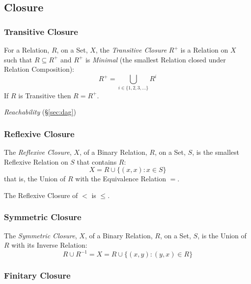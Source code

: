 \subsection{Closure}\label{sec:set_closure}

\subsubsection{Transitive Closure}\label{sec:transitive_closure}

For a Relation, $R$, on a Set, $X$, the \emph{Transitive Closure}
$R^+$ is a Relation on $X$ such that $R \subseteq R^+$ and $R^+$ is
\emph{Minimal} (the smallest Relation closed under Relation
Composition):
\[
    R^+ = \bigcup_{i \in \{1,2,3,...\}} R^i
\]
If $R$ is Transitive then $R = R^+$.

\emph{Reachability} (\S\ref{sec:dag})



\subsubsection{Reflexive Closure}\label{sec:reflexive_closure}

The \emph{Reflexive Closure}, $X$, of a Binary Relation, $R$, on a
Set, $S$, is the smallest Reflexive Relation on $S$ that contains $R$:
\[
    X = R \cup \{(x,x) : x \in S\}
\]
that is, the Union of $R$ with the Equivalence Relation $=$.

The Reflexive Closure of $<$ is $\leq$.



\subsubsection{Symmetric Closure}\label{sec:symmetric_closure}

The \emph{Symmetric Closure}, $X$, of a Binary Relation, $R$, on a
Set, $S$, is the Union of $R$ with its Inverse Relation:
\[
    R \cup R^{-1} = X = R \cup \{(x,y) : (y,x) \in R\}
\]



\subsubsection{Finitary Closure}\label{sec:finitary_closure}



